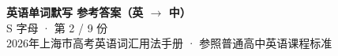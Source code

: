 \documentclass[10pt,a4paper]{article}
\begin{document}
\pagestyle{plain}

\begin{center}
{\LARGE\bfseries 英语单词默写 \quad 参考答案（英 $\to$ 中）}\\[0.22em]
{\large S 字母 · 第 2 / 9 份}\\[0.18em]
{\small 2026年上海市高考英语词汇用法手册 · 参照普通高中英语课程标准}
\end{center}

\vspace{0.2em}
\noindent{\color{rulegray}\rule{\textwidth}{0.8pt}}

\vspace{0.35em}

\vspace{0.25em}
\renewcommand{\arraystretch}{1.32}
\end{document}
